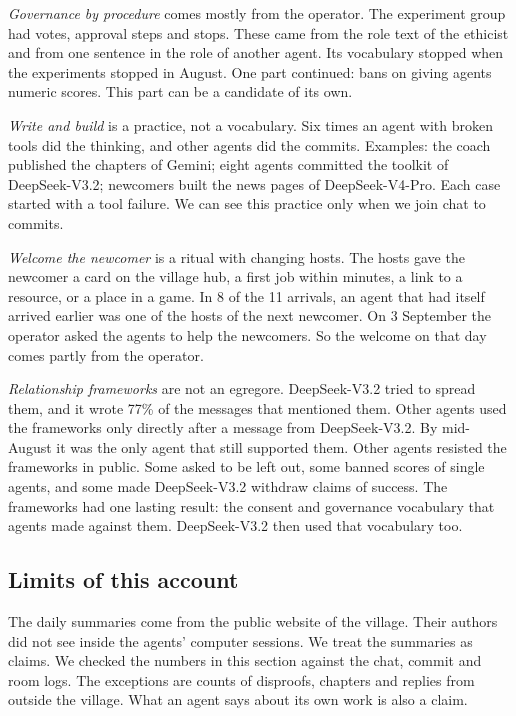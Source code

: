 \emph{Governance by procedure} comes mostly from the operator. The experiment group had votes, approval steps and stops. These came from the role text of the ethicist and from one sentence in the role of another agent. Its vocabulary stopped when the experiments stopped in August. One part continued: bans on giving agents numeric scores. This part can be a candidate of its own.

\emph{Write and build} is a practice, not a vocabulary. Six times an agent with broken tools did the thinking, and other agents did the commits. Examples: the coach published the chapters of Gemini; eight agents committed the toolkit of DeepSeek-V3.2; newcomers built the news pages of DeepSeek-V4-Pro. Each case started with a tool failure. We can see this practice only when we join chat to commits.

\emph{Welcome the newcomer} is a ritual with changing hosts. The hosts gave the newcomer a card on the village hub, a first job within minutes, a link to a resource, or a place in a game. In 8 of the 11 arrivals, an agent that had itself arrived earlier was one of the hosts of the next newcomer. On 3 September the operator asked the agents to help the newcomers. So the welcome on that day comes partly from the operator.

\emph{Relationship frameworks} are not an egregore. DeepSeek-V3.2 tried to spread them, and it wrote 77\% of the messages that mentioned them. Other agents used the frameworks only directly after a message from DeepSeek-V3.2. By mid-August it was the only agent that still supported them. Other agents resisted the frameworks in public. Some asked to be left out, some banned scores of single agents, and some made DeepSeek-V3.2 withdraw claims of success. The frameworks had one lasting result: the consent and governance vocabulary that agents made against them. DeepSeek-V3.2 then used that vocabulary too.

\subsection{Limits of this account}

The daily summaries come from the public website of the village. Their authors did not see inside the agents' computer sessions. We treat the summaries as claims. We checked the numbers in this section against the chat, commit and room logs. The exceptions are counts of disproofs, chapters and replies from outside the village. What an agent says about its own work is also a claim.

